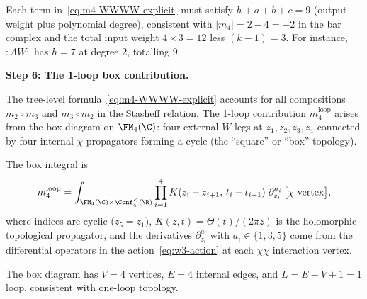 \begin{remark}
\label{rem:m4-weight-count}
Each term in~\eqref{eq:m4-WWWW-explicit} must satisfy
$h + a + b + c = 9$ (output weight plus polynomial degree),
consistent with $|m_4| = 2 - 4 = -2$ in the bar complex
and the total input weight $4 \times 3 = 12$ less $(k-1)=3$.
For instance, ${:}\Lambda W{:}$ has $h = 7$ at degree $2$, totalling $9$.
\end{remark}

\medskip
\noindent\textbf{Step 6: The 1-loop box contribution.}

\begin{construction}
\label{const:w3-m4-box}
The tree-level formula~\eqref{eq:m4-WWWW-explicit} accounts for all
compositions $m_2 \circ m_3$ and $m_3 \circ m_2$ in the Stasheff
relation. The 1-loop contribution $m_4^{\mathrm{loop}}$ arises from
the box diagram on $\FM_4(\C)$: four external $W$-legs at
$z_1, z_2, z_3, z_4$ connected by four internal $\chi$-propagators
forming a cycle (the ``square'' or ``box'' topology).

\smallskip
The box integral is
\begin{equation}
\label{eq:m4-box-integral}
m_4^{\mathrm{loop}}
= \int_{\FM_4(\C) \times \Conf_4^{<}(\R)}
\prod_{i=1}^{4}
K(z_i - z_{i+1},\, t_i - t_{i+1})\;
\partial_{z_i}^{a_i}\,\bigl[\text{$\chi$-vertex}\bigr],
\end{equation}
where indices are cyclic ($z_5 = z_1$),
$K(z,t) = \Theta(t)/(2\pi z)$ is the holomorphic-topological
propagator, and the derivatives $\partial_{z_i}^{a_i}$ with
$a_i \in \{1, 3, 5\}$ come from the differential operators in
the action~\eqref{eq:w3-action} at each $\chi\chi$ interaction vertex.

The box diagram has $V = 4$ vertices, $E = 4$ internal
edges, and $L = E - V + 1 = 1$ loop, consistent with
one-loop topology.
\end{construction}

